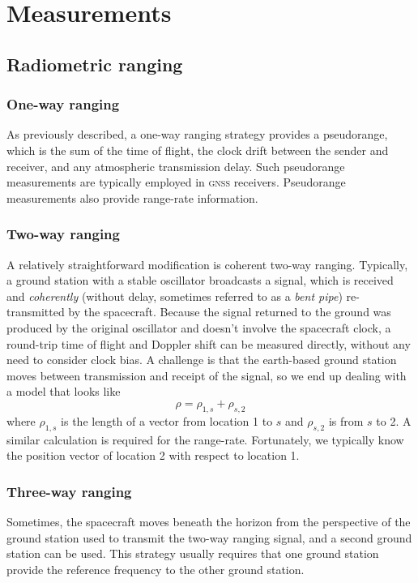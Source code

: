 \documentclass[12pt]{article}
\begin{document}
\section{Measurements}
\subsection{Radiometric ranging}
\subsubsection{One-way ranging}
As previously described, a one-way ranging strategy provides a pseudorange, which is the sum of the time of flight, the clock drift between the sender and receiver, and any atmospheric transmission delay. Such pseudorange measurements are typically employed in \textsc{gnss} receivers. Pseudorange measurements also provide range-rate information.

\subsubsection{Two-way ranging}
A relatively straightforward modification is coherent two-way ranging. Typically, a ground station with a stable oscillator broadcasts a signal, which is received and \textit{coherently} (without delay, sometimes referred to as a \textit{bent pipe}) re-transmitted by the spacecraft. Because the signal returned to the ground was produced by the original oscillator and doesn't involve the spacecraft clock, a round-trip time of flight and Doppler shift can be measured directly, without any need to consider clock bias. A challenge is that the earth-based ground station moves between transmission and receipt of the signal, so we end up dealing with a model that looks like
\begin{equation}
\rho = \rho_{1,s} + \rho_{s,2}
\end{equation}
where $\rho_{1,s}$ is the length of a vector from location 1 to $s$ and $\rho_{s,2}$ is from $s$ to 2. A similar calculation is required for the range-rate. Fortunately, we typically know the position vector of location 2 with respect to location 1.

\subsubsection{Three-way ranging}
Sometimes, the spacecraft moves beneath the horizon from the perspective of the ground station used to transmit the two-way ranging signal, and a second ground station can be used. This strategy usually requires that one ground station provide the reference frequency to the other ground station.
\end{document}
